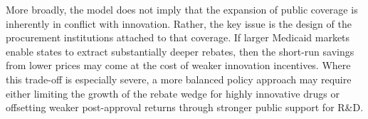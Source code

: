 \documentclass[12pt]{article}
\begin{document}
More broadly, the model does not imply that the expansion of public coverage is inherently in conflict with innovation. Rather, the key issue is the design of the procurement institutions attached to that coverage. If larger Medicaid markets enable states to extract substantially deeper rebates, then the short-run savings from lower prices may come at the cost of weaker innovation incentives. Where this trade-off is especially severe, a more balanced policy approach may require either limiting the growth of the rebate wedge for highly innovative drugs or offsetting weaker post-approval returns through stronger public support for R\&D.

\newpage



\end{document}
